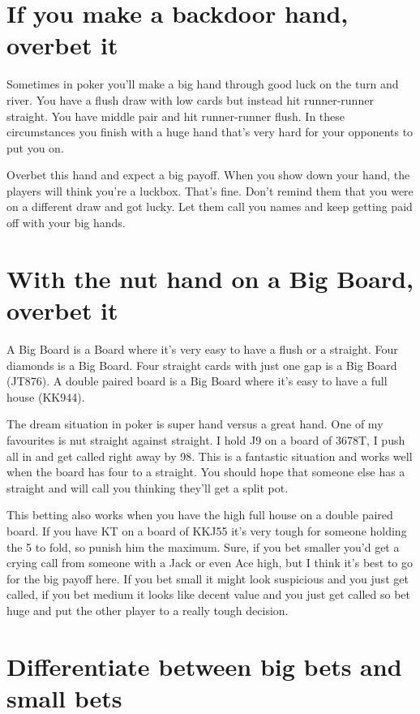 \section{If you make a backdoor hand, overbet it}

Sometimes in poker you'll make a big hand through good luck on the turn and
river. You have a flush draw with low cards but instead hit
runner-runner straight. You have middle pair and hit runner-runner
flush. In these circumstances you finish with a huge hand that's very
hard for your opponents to put you on.

Overbet this hand and expect a big payoff. When you show down your hand,
the players will think you're a luckbox. That's fine. Don't remind them
that you were on a different draw and got lucky. Let them call you names
and keep getting paid off with your big hands.

\section{With the nut hand on a Big Board, overbet it}

A Big Board is a Board where it's very easy to have a flush
or a straight. Four diamonds is a Big Board. Four
straight cards with just one gap is a Big Board (JT876).
A double paired board is a Big Board where it's easy to have a full
house (KK944).

The dream situation in poker is super hand versus a great hand.
One of my favourites is nut straight against straight. I hold J9
on a board of 3678T, I push all in and get called right away by
98. This is a fantastic situation and works well when the board
has four to a straight. You should hope that someone else has
a straight and will call you thinking they'll get a split pot.

This betting also works when you have the high full house on a
double paired board. If you have KT on a board of KKJ55 it's
very tough for someone holding the 5 to fold, so punish him the
maximum. Sure, if you bet smaller you'd get a crying call from
someone with a Jack or even Ace high, but I think it's best
to go for the big payoff here. If you bet small it might look
suspicious and you just get called, if you bet medium it looks
like decent value and you just get called so bet huge and put the
other player to a really tough decision.

\section{Differentiate between big bets and small bets}

